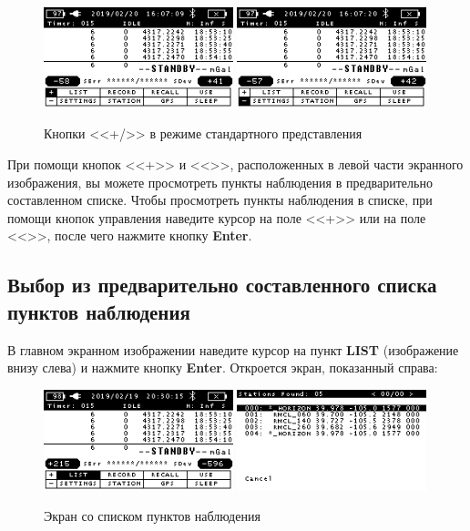 \begin{figure}[h]
  \centering
  \includegraphics[width=0.49\textwidth]{figures/+_-_buttons_under_standard_station_style_1}
  \includegraphics[width=0.49\textwidth]{figures/+_-_buttons_under_standard_station_style_2}
  \caption{Кнопки <<+/\textminus{}>> в режиме стандартного представления}
  \label{fig:+_-_buttons_under_standard_station_style}
\end{figure}

При помощи кнопок <<+>> и <<\textminus{}>>, расположенных в левой части
экранного изображения, вы можете просмотреть пункты наблюдения в предварительно
составленном списке. Чтобы просмотреть пункты наблюдения в списке, при помощи
кнопок управления наведите курсор на поле <<+>> или на поле <<\textminus{}>>,
после чего нажмите кнопку \textbf{Enter}.

\subsection[Выбор пунктов из списка]{Выбор из предварительно составленного списка пунктов наблюдения}

В главном экранном изображении наведите курсор на пункт \textbf{LIST}
(изображение внизу слева) и нажмите кнопку \textbf{Enter}. Откроется экран,
показанный справа:

\begin{figure}[h]
  \centering
  \includegraphics[width=0.49\textwidth]{figures/station_list_screen_1}
  \includegraphics[width=0.49\textwidth]{figures/station_list_screen_2}
  \caption{Экран со списком пунктов наблюдения}
  \label{fig:station_list_screen}
\end{figure}

